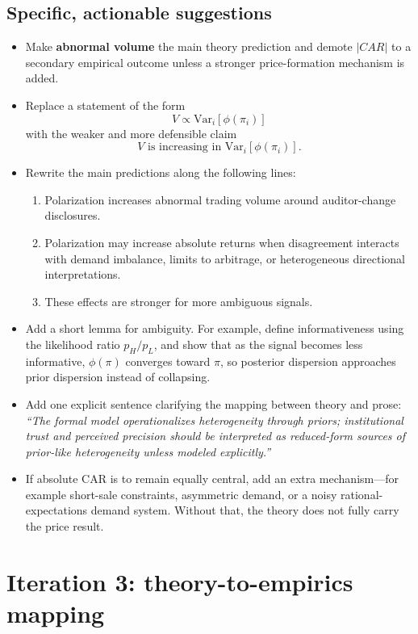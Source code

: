 \documentclass[12pt]{article}
\begin{document}
\subsection*{Specific, actionable suggestions}
\begin{itemize}[leftmargin=1.5em]
    \item Make \textbf{abnormal volume} the main theory prediction and demote \( |CAR| \) to a secondary empirical outcome unless a stronger price-formation mechanism is added.
    \item Replace a statement of the form
    \[
    V \propto \mathrm{Var}_i[\phi(\pi_i)]
    \]
    with the weaker and more defensible claim
    \[
    V \text{ is increasing in } \mathrm{Var}_i[\phi(\pi_i)].
    \]
    \item Rewrite the main predictions along the following lines:
    \begin{enumerate}[label=(\roman*), leftmargin=1.5em]
        \item Polarization increases abnormal trading volume around auditor-change disclosures.
        \item Polarization may increase absolute returns when disagreement interacts with demand imbalance, limits to arbitrage, or heterogeneous directional interpretations.
        \item These effects are stronger for more ambiguous signals.
    \end{enumerate}
    \item Add a short lemma for ambiguity. For example, define informativeness using the likelihood ratio \(p_H/p_L\), and show that as the signal becomes less informative, \(\phi(\pi)\) converges toward \(\pi\), so posterior dispersion approaches prior dispersion instead of collapsing.
    \item Add one explicit sentence clarifying the mapping between theory and prose: \emph{``The formal model operationalizes heterogeneity through priors; institutional trust and perceived precision should be interpreted as reduced-form sources of prior-like heterogeneity unless modeled explicitly.''}
    \item If absolute CAR is to remain equally central, add an extra mechanism---for example short-sale constraints, asymmetric demand, or a noisy rational-expectations demand system. Without that, the theory does not fully carry the price result.
\end{itemize}

\section*{Iteration 3: theory-to-empirics mapping}
\end{document}
